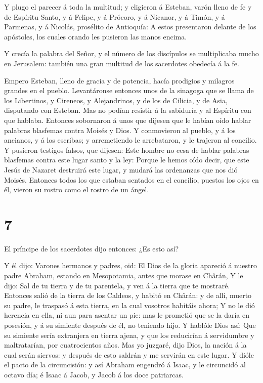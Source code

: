  Y plugo el parecer á toda la multitud; y eligieron á
Esteban, varón lleno de fe y de Espíritu Santo, y á Felipe, y á Prócoro,
y á Nicanor, y á Timón, y á Parmenas, y á Nicolás, prosélito de
Antioquía:  A estos presentaron delante de los apóstoles,
los cuales orando les pusieron las manos encima.

 Y crecía la palabra del Señor, y el número de los
discípulos se multiplicaba mucho en Jerusalem: también una gran multitud
de los sacerdotes obedecía á la fe.

 Empero Esteban, lleno de gracia y de potencia, hacía
prodigios y milagros grandes en el pueblo.  Levantáronse
entonces unos de la sinagoga que se llama de los Libertinos, y Cireneos,
y Alejandrinos, y de los de Cilicia, y de Asia, disputando con Esteban.
 Mas no podían resistir á la sabiduría y al Espíritu con
que hablaba.  Entonces sobornaron á unos que dijesen que le
habían oído hablar palabras blasfemas contra Moisés y Dios.
 Y conmovieron al pueblo, y á los ancianos, y á los
escribas; y arremetiendo le arrebataron, y le trajeron al concilio.
 Y pusieron testigos falsos, que dijesen: Este hombre no
cesa de hablar palabras blasfemas contra este lugar santo y la ley:
 Porque le hemos oído decir, que este Jesús de Nazaret
destruirá este lugar, y mudará las ordenanzas que nos dió Moisés.
 Entonces todos los que estaban sentados en el concilio,
puestos los ojos en él, vieron su rostro como el rostro de un ángel.

\hypertarget{section-6}{%
\section{7}\label{section-6}}

 El príncipe de los sacerdotes dijo entonces: ¿Es esto así?

 Y él dijo: Varones hermanos y padres, oid: El Dios de la
gloria apareció á nuestro padre Abraham, estando en Mesopotamia, antes
que morase en Chârán,  Y le dijo: Sal de tu tierra y de tu
parentela, y ven á la tierra que te mostraré.  Entonces
salió de la tierra de los Caldeos, y habitó en Chârán: y de allí, muerto
su padre, le traspasó á esta tierra, en la cual vosotros habitáis ahora;
 Y no le dió herencia en ella, ni aun para asentar un pie:
mas le prometió que se la daría en posesión, y á su simiente después de
él, no teniendo hijo.  Y hablóle Dios así: Que su simiente
sería extranjera en tierra ajena, y que los reducirían á servidumbre y
maltratarían, por cuatrocientos años.  Mas yo juzgaré, dijo
Dios, la nación á la cual serán siervos: y después de esto saldrán y me
servirán en este lugar.  Y dióle el pacto de la
circuncisión: y así Abraham engendró á Isaac, y le circuncidó al octavo
día; é Isaac á Jacob, y Jacob á los doce patriarcas.

